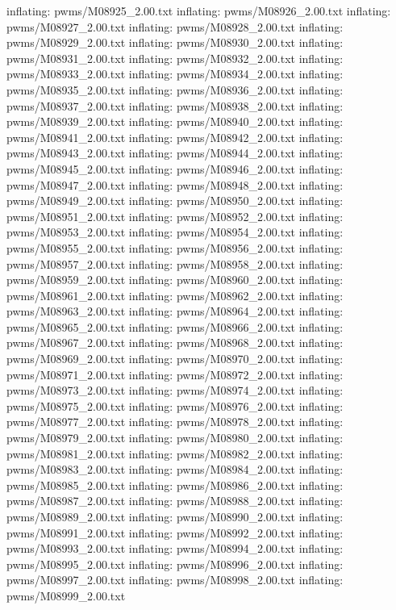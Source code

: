 \documentclass[letterpaper,10pt,english]{sphinxmanual}
\begin{document}
{\begin{sphinxVerbatim}[commandchars=\\\{\}]
  inflating: pwms/M08925\_2.00.txt
  inflating: pwms/M08926\_2.00.txt
  inflating: pwms/M08927\_2.00.txt
  inflating: pwms/M08928\_2.00.txt
  inflating: pwms/M08929\_2.00.txt
  inflating: pwms/M08930\_2.00.txt
  inflating: pwms/M08931\_2.00.txt
  inflating: pwms/M08932\_2.00.txt
  inflating: pwms/M08933\_2.00.txt
  inflating: pwms/M08934\_2.00.txt
  inflating: pwms/M08935\_2.00.txt
  inflating: pwms/M08936\_2.00.txt
  inflating: pwms/M08937\_2.00.txt
  inflating: pwms/M08938\_2.00.txt
  inflating: pwms/M08939\_2.00.txt
  inflating: pwms/M08940\_2.00.txt
  inflating: pwms/M08941\_2.00.txt
  inflating: pwms/M08942\_2.00.txt
  inflating: pwms/M08943\_2.00.txt
  inflating: pwms/M08944\_2.00.txt
  inflating: pwms/M08945\_2.00.txt
  inflating: pwms/M08946\_2.00.txt
  inflating: pwms/M08947\_2.00.txt
  inflating: pwms/M08948\_2.00.txt
  inflating: pwms/M08949\_2.00.txt
  inflating: pwms/M08950\_2.00.txt
  inflating: pwms/M08951\_2.00.txt
  inflating: pwms/M08952\_2.00.txt
  inflating: pwms/M08953\_2.00.txt
  inflating: pwms/M08954\_2.00.txt
  inflating: pwms/M08955\_2.00.txt
  inflating: pwms/M08956\_2.00.txt
  inflating: pwms/M08957\_2.00.txt
  inflating: pwms/M08958\_2.00.txt
  inflating: pwms/M08959\_2.00.txt
  inflating: pwms/M08960\_2.00.txt
  inflating: pwms/M08961\_2.00.txt
  inflating: pwms/M08962\_2.00.txt
  inflating: pwms/M08963\_2.00.txt
  inflating: pwms/M08964\_2.00.txt
  inflating: pwms/M08965\_2.00.txt
  inflating: pwms/M08966\_2.00.txt
  inflating: pwms/M08967\_2.00.txt
  inflating: pwms/M08968\_2.00.txt
  inflating: pwms/M08969\_2.00.txt
  inflating: pwms/M08970\_2.00.txt
  inflating: pwms/M08971\_2.00.txt
  inflating: pwms/M08972\_2.00.txt
  inflating: pwms/M08973\_2.00.txt
  inflating: pwms/M08974\_2.00.txt
  inflating: pwms/M08975\_2.00.txt
  inflating: pwms/M08976\_2.00.txt
  inflating: pwms/M08977\_2.00.txt
  inflating: pwms/M08978\_2.00.txt
  inflating: pwms/M08979\_2.00.txt
  inflating: pwms/M08980\_2.00.txt
  inflating: pwms/M08981\_2.00.txt
  inflating: pwms/M08982\_2.00.txt
  inflating: pwms/M08983\_2.00.txt
  inflating: pwms/M08984\_2.00.txt
  inflating: pwms/M08985\_2.00.txt
  inflating: pwms/M08986\_2.00.txt
  inflating: pwms/M08987\_2.00.txt
  inflating: pwms/M08988\_2.00.txt
  inflating: pwms/M08989\_2.00.txt
  inflating: pwms/M08990\_2.00.txt
  inflating: pwms/M08991\_2.00.txt
  inflating: pwms/M08992\_2.00.txt
  inflating: pwms/M08993\_2.00.txt
  inflating: pwms/M08994\_2.00.txt
  inflating: pwms/M08995\_2.00.txt
  inflating: pwms/M08996\_2.00.txt
  inflating: pwms/M08997\_2.00.txt
  inflating: pwms/M08998\_2.00.txt
  inflating: pwms/M08999\_2.00.txt

\end{sphinxVerbatim}}
\end{document}

